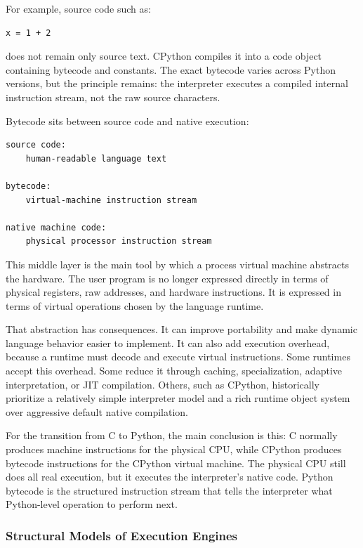 For example, source code such as:

\begin{verbatim}
x = 1 + 2
\end{verbatim}

does not remain only source text. CPython compiles it into a code object containing bytecode and constants. The exact bytecode varies across Python versions, but the principle remains: the interpreter executes a compiled internal instruction stream, not the raw source characters.

Bytecode sits between source code and native execution:

\begin{verbatim}
source code:
    human-readable language text

bytecode:
    virtual-machine instruction stream

native machine code:
    physical processor instruction stream
\end{verbatim}

This middle layer is the main tool by which a process virtual machine abstracts the hardware. The user program is no longer expressed directly in terms of physical registers, raw addresses, and hardware instructions. It is expressed in terms of virtual operations chosen by the language runtime.

That abstraction has consequences. It can improve portability and make dynamic language behavior easier to implement. It can also add execution overhead, because a runtime must decode and execute virtual instructions. Some runtimes accept this overhead. Some reduce it through caching, specialization, adaptive interpretation, or JIT compilation. Others, such as CPython, historically prioritize a relatively simple interpreter model and a rich runtime object system over aggressive default native compilation.

For the transition from C to Python, the main conclusion is this: C normally produces machine instructions for the physical CPU, while CPython produces bytecode instructions for the CPython virtual machine. The physical CPU still does all real execution, but it executes the interpreter's native code. Python bytecode is the structured instruction stream that tells the interpreter what Python-level operation to perform next.



\subsubsection{Structural Models of Execution Engines}

